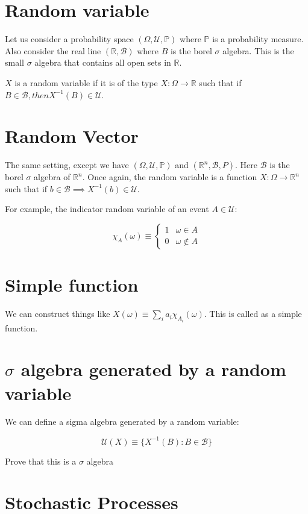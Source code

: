 \documentclass{book}
\newcommand{\R}{\ensuremath{\mathbb{R}}}
\renewcommand{\P}{\ensuremath{\mathbb{P}}}
\newcommand{\B}{\ensuremath{\mathscr{B}}}
\newcommand{\U}{\ensuremath{\mathscr{U}}}
\theoremstyle{definition}
\begin{document}
\section{Random variable}

Let us consider a probability space $(\Omega, \U, \P)$ where $\P$ is a probability
measure. Also consider the real line $(\R, \B)$  where $B$ is the borel $\sigma$
algebra. This is the small $\sigma$ algebra that contains all open sets in $\mathbb R$.

$X$ is a random variable if it is of the type $X: \Omega \rightarrow \R$
such that if $B \in \B, then X^{-1}(B) \in \U$.

\section{Random Vector}

The same setting, except we have $(\Omega, \U, \P)$ and $(\R^n, \B, P)$. Here
$\B$ is the borel $\sigma$ algebra of $\R^n$. Once again, the random variable
is a function $X: \Omega \rightarrow \R^n$ such that if $b \in \B \implies X^{-1}(b) \in \U$.

For example, the indicator random variable of an event $A \in \U$:

$$
\chi_A (\omega) \equiv
\begin{cases}
1 & \omega \in A \\
0 & \omega \not \in A
\end{cases}
$$

\section{Simple function}
We can construct things like $X(\omega) \equiv \sum_i a_i \chi_{A_i}(\omega)$.
This is called as a simple function.

\section{$\sigma$ algebra generated by a random variable}
We can define a sigma algebra generated by a random variable:

$$
\U(X) \equiv \{ X^{-1}(B): B \in \B \}
$$

Prove that this is a $\sigma$ algebra

\section{Stochastic Processes}
\end{document}
